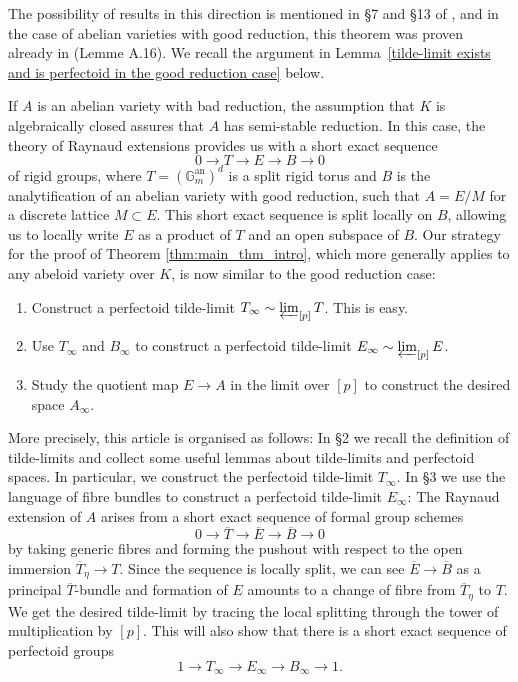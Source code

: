 \documentclass[10pt,oneside]{amsart}
\theoremstyle{definition}
\begin{document}
The possibility of results in this direction is mentioned in \S 7 and \S 13 of \cite{scholzeICMproceedings}, and in the case of abelian varieties with good reduction, this theorem was proven already in \cite[Lemme~A.16]{Pilloni-Stroh} (Lemme A.16). We recall the argument in Lemma~\ref{tilde-limit exists and is perfectoid in the good reduction case} below. 

If $A$ is an abelian variety with bad reduction, the assumption that $K$ is algebraically closed assures that $A$ has semi-stable reduction.
In this case, the theory of Raynaud extensions provides us with a short exact sequence 
\[ 0 \rightarrow T \rightarrow E  \rightarrow  B  \rightarrow  0\]
of rigid groups, where $T = (\mathbb G_m^{\text{an}})^{d}$ is a split rigid torus and $B$ is the analytification of an abelian variety with good reduction, such that $A = E/M$ for a discrete lattice $M \subset E$. This short exact sequence is split locally on $B$, allowing us to locally write $E$ as a product of $T$ and an open subspace of $B$.
Our strategy for the proof of Theorem \ref{thm:main_thm_intro}, which more generally applies to any abeloid variety over $K$, is now similar to the good reduction case:
\begin{enumerate}
\item Construct a perfectoid tilde-limit $T_\infty\sim\varprojlim_{[p]} T$. This is easy.
\item Use $T_\infty$ and $B_\infty$ to construct a perfectoid tilde-limit $E_\infty\sim\varprojlim_{[p]} E$.
\item Study the quotient map $E\rightarrow A$ in the limit over $[p]$ to construct the desired space $A_\infty$.
\end{enumerate}

More precisely, this article is organised as follows: In \S2 we recall the definition of tilde-limits and collect some useful lemmas about tilde-limits and perfectoid spaces. In particular, we construct the perfectoid tilde-limit $T_\infty$. In \S3 we use the language of fibre bundles to construct a perfectoid tilde-limit $E_\infty$: The Raynaud extension of $A$ arises from a short exact sequence of formal group schemes
\[0\rightarrow \overline{T}\rightarrow \overline{E}\rightarrow \overline{B}\rightarrow 0\]
by taking generic fibres and forming the pushout with respect to the open immersion $\overline{T}_\eta\rightarrow T$. Since the sequence is locally split, we can see $\overline{E}\rightarrow \overline{B}$ as a principal $\overline{T}$-bundle and formation of $E$ amounts to a change of fibre from $\overline{T}_\eta$ to $T$. We get the desired tilde-limit by tracing the local splitting through the tower of multiplication by $[p]$. This will also show that there is a short exact sequence of perfectoid groups
\[ 1\to T_\infty \to E_\infty \to B_\infty \to 1.\]
\end{document}
